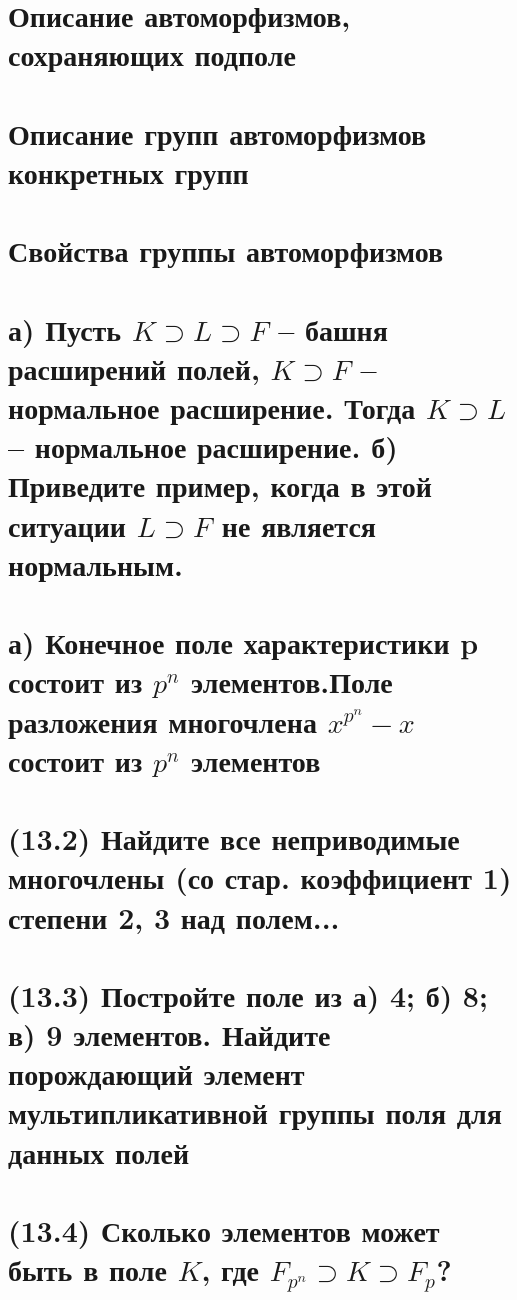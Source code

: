 \section{Описание автоморфизмов, сохраняющих подполе}


\section{Описание групп автоморфизмов конкретных групп}


\section{Свойства группы автоморфизмов}


\section{а) Пусть $K \supset L \supset F$ -- башня расширений полей, $K \supset F$ -- нормальное расширение. Тогда $K \supset L$ -- нормальное расширение. б) Приведите пример, когда в этой ситуации $L \supset F$ не является нормальным.}


\newpage

\section{а) Конечное поле характеристики p состоит из $p^n$ элементов.Поле разложения многочлена $x^{p^n} − x$ состоит из $p^n$ элементов}

\newpage

\section{(13.2) Найдите все неприводимые многочлены (со стар. коэффициент 1) степени 2, 3 над полем...}

\newpage

\section{(13.3) Постройте поле из а) 4; б) 8; в) 9 элементов. Найдите порождающий элемент мультипликативной группы поля для данных полей}


\section{(13.4) Сколько элементов может быть в поле $K$, где $F_{p^n} \supset K \supset F_p$?}

\newpage{}